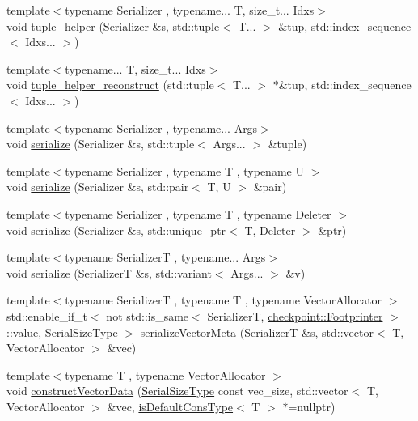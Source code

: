 \begin{DoxyCompactItemize}
\item 
{\footnotesize template$<$typename Serializer , typename... T, size\+\_\+t... Idxs$>$ }\\void \hyperlink{namespacecheckpoint_ab763d3ca9396ff9a1896f5da6c2b3c54}{tuple\+\_\+helper} (Serializer \&s, std\+::tuple$<$ T... $>$ \&tup, std\+::index\+\_\+sequence$<$ Idxs... $>$)
\item 
{\footnotesize template$<$typename... T, size\+\_\+t... Idxs$>$ }\\void \hyperlink{namespacecheckpoint_a8370a2284f01f2fada353a096ab95f4d}{tuple\+\_\+helper\+\_\+reconstruct} (std\+::tuple$<$ T... $>$ $\ast$\&tup, std\+::index\+\_\+sequence$<$ Idxs... $>$)
\item 
{\footnotesize template$<$typename Serializer , typename... Args$>$ }\\void \hyperlink{namespacecheckpoint_a7ac21fa6ad08fd64a47c789c32966019}{serialize} (Serializer \&s, std\+::tuple$<$ Args... $>$ \&tuple)
\item 
{\footnotesize template$<$typename Serializer , typename T , typename U $>$ }\\void \hyperlink{namespacecheckpoint_a7b5c3ff67d3f7b65cfb46da7617e87ad}{serialize} (Serializer \&s, std\+::pair$<$ T, U $>$ \&pair)
\item 
{\footnotesize template$<$typename Serializer , typename T , typename Deleter $>$ }\\void \hyperlink{namespacecheckpoint_a617341cb0473cbdce921a3a4d049f4fc}{serialize} (Serializer \&s, std\+::unique\+\_\+ptr$<$ T, Deleter $>$ \&ptr)
\item 
{\footnotesize template$<$typename SerializerT , typename... Args$>$ }\\void \hyperlink{namespacecheckpoint_a8814df20276406605912524fad29c49b}{serialize} (SerializerT \&s, std\+::variant$<$ Args... $>$ \&v)
\item 
{\footnotesize template$<$typename SerializerT , typename T , typename Vector\+Allocator $>$ }\\std\+::enable\+\_\+if\+\_\+t$<$ not std\+::is\+\_\+same$<$ SerializerT, \hyperlink{structcheckpoint_1_1_footprinter}{checkpoint\+::\+Footprinter} $>$\+::value, \hyperlink{namespacecheckpoint_a083f6674da3f94c2901b18c6d238217c}{Serial\+Size\+Type} $>$ \hyperlink{namespacecheckpoint_a1f197f1929607e9e28b3d33993196729}{serialize\+Vector\+Meta} (SerializerT \&s, std\+::vector$<$ T, Vector\+Allocator $>$ \&vec)
\item 
{\footnotesize template$<$typename T , typename Vector\+Allocator $>$ }\\void \hyperlink{namespacecheckpoint_a74da9a404a365bb8b0e4f387dbccc18c}{construct\+Vector\+Data} (\hyperlink{namespacecheckpoint_a083f6674da3f94c2901b18c6d238217c}{Serial\+Size\+Type} const vec\+\_\+size, std\+::vector$<$ T, Vector\+Allocator $>$ \&vec, \hyperlink{namespacecheckpoint_a58224a3b056d9e2aa73d563871981a7d}{is\+Default\+Cons\+Type}$<$ T $>$ $\ast$=nullptr)

\end{DoxyCompactItemize}
